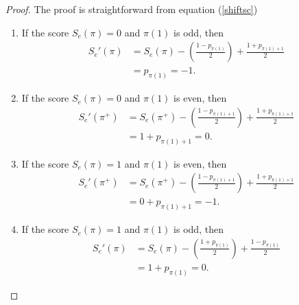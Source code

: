 \documentclass[a4paper,12pt]{article}
\theoremstyle{definition}
\numberwithin{equation}{section}
\begin{document}
\begin{proof}
  The proof is straightforward from equation (\ref{shiftsc})
    \begin{enumerate}
    \item If the score $S_e(\pi) = 0$ and $\pi(1)$ is odd, then 
    \begin{align*}
        S_e'(\pi) &= S_e(\pi) - \left(\frac{1 - p_{\pi(1)}}{2}\right) + \frac{1 + p_{\pi(1)+1}}{2} \\
        &=  p_{\pi(1)} = -1. 
    \end{align*}
    
   
    \item  If the score $S_e(\pi) = 0$ and $\pi(1)$ is even, then 
    \begin{align*}
        S_e'(\pi^+) &= S_e(\pi^+) - \left(\frac{1 - p_{\pi(1)+1}}{2}\right) + \frac{1 + p_{\pi(1)+1}}{2} \\
        &= 1 + p_{\pi(1)+1} = 0. 
    \end{align*}
    
    \item If the score $S_e(\pi) = 1$ and $\pi(1)$ is even, then 
       \begin{align*}
        S_e'(\pi^+) &= S_e(\pi^+) - \left(\frac{1- p_{\pi(1)+1}}{2}\right) + \frac{1 + p_{\pi(1)+1}}{2} \\
        &= 0+p_{\pi(1)+1} = -1.  
    \end{align*}

    \item  If the score $S_e(\pi) = 1$ and $\pi(1)$ is odd, then 
       \begin{align*}
        S_e'(\pi) &= S_e(\pi) - \left(\frac{1+ p_{\pi(1)}}{2}\right) + \frac{1 - p_{\pi(1)}}{2} \\
        &= 1+ p_{\pi(1)} = 0.  
    \end{align*}
    \end{enumerate}
\end{proof}
\end{document}
